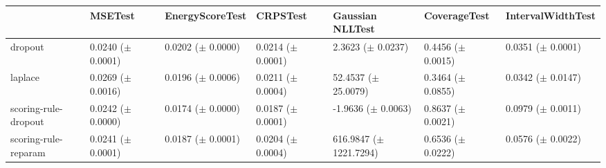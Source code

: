 \begin{tabular}{lllllll}
\toprule
 & MSETest & EnergyScoreTest & CRPSTest & Gaussian NLLTest & CoverageTest & IntervalWidthTest \\
\midrule
dropout & \makecell{0.0240 \\ ($\pm$ 0.0001)} & \makecell{0.0202 \\ ($\pm$ 0.0000)} & \makecell{0.0214 \\ ($\pm$ 0.0001)} & \makecell{2.3623 \\ ($\pm$ 0.0237)} & \makecell{0.4456 \\ ($\pm$ 0.0015)} & \makecell{0.0351 \\ ($\pm$ 0.0001)} \\
laplace & \makecell{0.0269 \\ ($\pm$ 0.0016)} & \makecell{0.0196 \\ ($\pm$ 0.0006)} & \makecell{0.0211 \\ ($\pm$ 0.0004)} & \makecell{52.4537 \\ ($\pm$ 25.0079)} & \makecell{0.3464 \\ ($\pm$ 0.0855)} & \makecell{0.0342 \\ ($\pm$ 0.0147)} \\
scoring-rule-dropout & \makecell{0.0242 \\ ($\pm$ 0.0000)} & \makecell{0.0174 \\ ($\pm$ 0.0000)} & \makecell{0.0187 \\ ($\pm$ 0.0001)} & \makecell{-1.9636 \\ ($\pm$ 0.0063)} & \makecell{0.8637 \\ ($\pm$ 0.0021)} & \makecell{0.0979 \\ ($\pm$ 0.0011)} \\
scoring-rule-reparam & \makecell{0.0241 \\ ($\pm$ 0.0001)} & \makecell{0.0187 \\ ($\pm$ 0.0001)} & \makecell{0.0204 \\ ($\pm$ 0.0004)} & \makecell{616.9847 \\ ($\pm$ 1221.7294)} & \makecell{0.6536 \\ ($\pm$ 0.0222)} & \makecell{0.0576 \\ ($\pm$ 0.0022)} \\
\bottomrule
\end{tabular}
